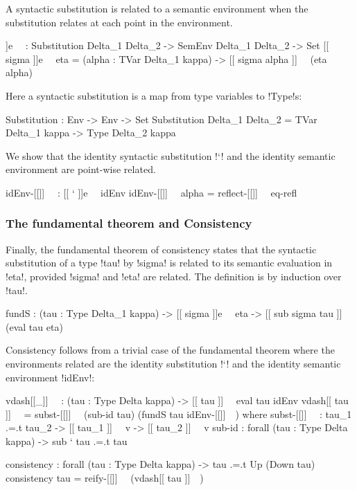 \documentclass[sigplan,10pt,anonymous,review]{acmart}\settopmatter{printfolios=true,printccs=false,printacmref=false}
\begin{document}
A syntactic substitution is related to a semantic environment when the substitution relates at each point in the environment.

\begin{agda}
[[_]]e~~ : Substitution Delta_1  Delta_2 -> SemEnv Delta_1  Delta_2 -> Set 
[[ sigma ]]e~~ eta = (alpha : TVar Delta_1 kappa) -> [[ sigma alpha ]]~~ (eta alpha)
\end{agda}

Here a syntactic substitution is a map from type variables to !Type!s: 

\begin{agda}
Substitution : Env -> Env -> Set
Substitution Delta_1  Delta_2 = TVar Delta_1 kappa -> Type Delta_2 kappa
\end{agda}

We show that the identity syntactic substitution !`! and the identity semantic environment are point-wise related. 

\begin{agda}
idEnv-[[]]~~ : [[ ` ]]e~~ idEnv 
idEnv-[[]]~~ alpha = reflect-[[]]~~ eq-refl
\end{agda}

\subsubsection{The fundamental theorem and Consistency}

Finally, the fundamental theorem of consistency states that the syntactic substitution of a type !tau! by !sigma! is related to its semantic evaluation in !eta!, provided !sigma! and !eta! are related. The definition is by induction over !tau!.

\begin{agda}
fundS : (tau : Type Delta_1 kappa) -> 
        [[ sigma ]]e~~ eta -> 
        [[ sub sigma tau ]]~~ (eval tau eta)
\end{agda}

Consistency follows from a trivial case of the fundamental theorem where the environments related are the identity substitution !`! and the identity semantic environment !idEnv!:

\begin{agda}
vdash[[_]]~~ : (tau : Type Delta kappa)  -> [[ tau ]]~~ eval tau idEnv  
vdash[[ tau ]]~~ = 
  subst-[[]]~~ (sub-id tau) (fundS tau idEnv-[[]]~~)
  where
    subst-[[]]~~ : tau_1 .=.t tau_2 -> [[ tau_1 ]]~~ v -> [[ tau_2 ]]~~ v
    sub-id : forall (tau : Type Delta kappa) -> sub ` tau .=.t tau

consistency : forall (tau : Type Delta kappa) -> tau .=.t Up (Down tau)
consistency tau =  reify-[[]]~~ (vdash[[ tau ]]~~)
\end{agda}
\end{document}
